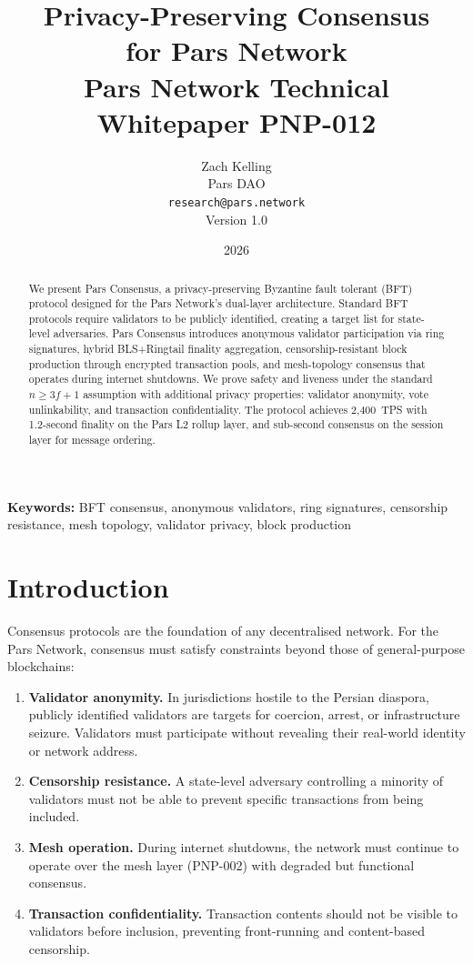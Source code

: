 \documentclass[11pt,a4paper]{article}
\title{%
    \textbf{Privacy-Preserving Consensus\\
    for Pars Network}\\[0.5em]
    \large Pars Network Technical Whitepaper PNP-012
}
\author{%
    Zach Kelling\\
    Pars DAO\\
    \texttt{research@pars.network}\\[0.5em]
    \small Version 1.0
}
\date{2026}
\begin{document}
\parscoverpage

\thispagestyle{fancy}

\begin{abstract}
\noindent
We present Pars Consensus, a privacy-preserving Byzantine fault tolerant
(BFT) protocol designed for the Pars Network's dual-layer architecture.
Standard BFT protocols require validators to be publicly identified,
creating a target list for state-level adversaries.  Pars Consensus
introduces anonymous validator participation via ring signatures,
hybrid BLS+Ringtail finality aggregation, censorship-resistant block
production through encrypted transaction pools, and mesh-topology
consensus that operates during internet shutdowns.  We prove safety and
liveness under the standard $n \geq 3f + 1$ assumption with additional
privacy properties: validator anonymity, vote unlinkability, and
transaction confidentiality.  The protocol achieves 2{,}400~TPS with
1.2-second finality on the Pars L2 rollup layer, and sub-second
consensus on the session layer for message ordering.
\end{abstract}

\vspace{1em}
\noindent\textbf{Keywords:} BFT consensus, anonymous validators,
ring signatures, censorship resistance, mesh topology, validator
privacy, block production

\tableofcontents
\newpage

\section{Introduction}
\label{sec:intro}

Consensus protocols are the foundation of any decentralised network.
For the Pars Network, consensus must satisfy constraints beyond those
of general-purpose blockchains:

\begin{enumerate}
    \item \textbf{Validator anonymity.}  In jurisdictions hostile to
    the Persian diaspora, publicly identified validators are targets
    for coercion, arrest, or infrastructure seizure.  Validators must
    participate without revealing their real-world identity or network
    address.
    \item \textbf{Censorship resistance.}  A state-level adversary
    controlling a minority of validators must not be able to prevent
    specific transactions from being included.
    \item \textbf{Mesh operation.}  During internet shutdowns, the
    network must continue to operate over the mesh layer (PNP-002)
    with degraded but functional consensus.
    \item \textbf{Transaction confidentiality.}  Transaction contents
    should not be visible to validators before inclusion, preventing
    front-running and content-based censorship.
\end{enumerate}
\end{document}
